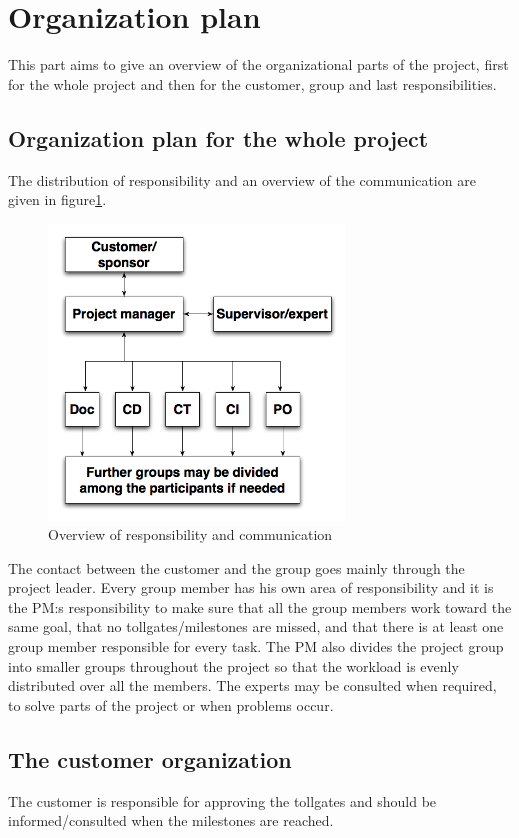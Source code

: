\section{Organization plan} %
This part aims to give an overview of the organizational parts of the project, first for the whole project and then for the customer, group and last responsibilities.
\subsection{Organization plan for the whole project}
The distribution of responsibility and an overview of the communication are given in figure\ref{FlowOrg}.
\begin{figure}[h]
	\includegraphics[width=0.7\textwidth]{Images/FlowChart_Org.png}
	\caption{Overview of responsibility and communication}
	\label{FlowOrg}
\end{figure}
The contact between the customer and the group goes mainly through the project leader. Every group member has his own area of responsibility and it is the PM:s responsibility to make sure that all the group members work toward the same goal, that no tollgates/milestones are missed, and that there is at least one group member responsible for every task. The PM also divides the project group into smaller groups throughout the project so that the workload is evenly distributed over all the members. The experts may be consulted when required, to solve parts of the project or when problems occur.
\subsection{The customer organization}
The customer is responsible for approving the tollgates and should be informed/consulted when the milestones are reached.
